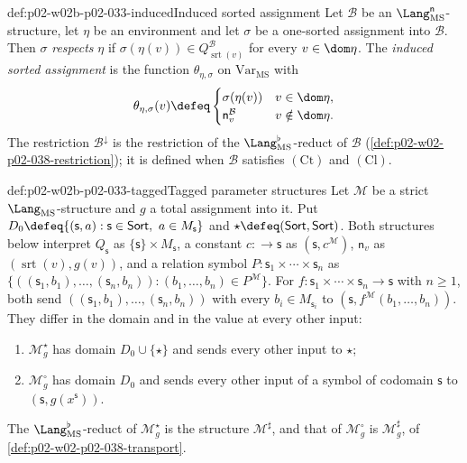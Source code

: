 \begin{hbdefinition}{def:p02-w02b-p02-033-induced}{Induced sorted assignment}
Let \(\mathcal B\) be an \(\Lang_{\mathrm{MS}}^{\mathsf n}\)-structure, let
\(\eta\) be an environment and let \(\sigma\) be a one-sorted assignment into
\(\mathcal B\).  Then \(\sigma\) \emph{respects} \(\eta\) if
\(\sigma(\eta(v))\in Q_{\operatorname{srt}(v)}^{\mathcal B}\) for every
\(v\in\dom\eta\).  The \emph{induced sorted assignment} is the function
\(\theta_{\eta,\sigma}\) on \(\mathrm{Var}_{\mathrm{MS}}\) with
\[
 \theta_{\eta,\sigma}(v)\defeq
 \begin{cases}
  \sigma(\eta(v)) & v\in\dom\eta,\\
  \mathsf n_v^{\mathcal B} & v\notin\dom\eta.
 \end{cases}
\]
The restriction \(\mathcal B^{\downarrow}\) is the restriction of the
\(\Lang_{\mathrm{MS}}^{\flat}\)-reduct of \(\mathcal B\)
(\cref{def:p02-w02-p02-038-restriction}); it is defined when \(\mathcal B\)
satisfies \((\mathrm{Ct})\) and \((\mathrm{Cl})\).
\end{hbdefinition}

\begin{hbdefinition}{def:p02-w02b-p02-033-tagged}{Tagged parameter structures}
Let \(\mathcal M\) be a strict \(\Lang_{\mathrm{MS}}\)-structure and \(g\) a
total assignment into it.  Put
\(D_0\defeq\{(\mathsf s,a):\mathsf s\in\mathsf{Sort},\ a\in M_{\mathsf s}\}\)
and \(\star\defeq(\mathsf{Sort},\mathsf{Sort})\).  Both structures below
interpret \(Q_{\mathsf s}\) as \(\{\mathsf s\}\times M_{\mathsf s}\), a
constant \(c:\longrightarrow\mathsf s\) as \((\mathsf s,c^{\mathcal M})\),
\(\mathsf n_v\) as \((\operatorname{srt}(v),g(v))\), and a relation symbol
\(P:\mathsf s_1\times\cdots\times\mathsf s_n\) as
\(\{((\mathsf s_1,b_1),\ldots,(\mathsf s_n,b_n)):(b_1,\ldots,b_n)\in
P^{\mathcal M}\}\).  For
\(f:\mathsf s_1\times\cdots\times\mathsf s_n\longrightarrow\mathsf s\) with
\(n\geq1\), both send \(((\mathsf s_1,b_1),\ldots,(\mathsf s_n,b_n))\) with
every \(b_i\in M_{\mathsf s_i}\) to
\((\mathsf s,f^{\mathcal M}(b_1,\ldots,b_n))\).  They differ in the domain and
in the value at every other input:
\begin{enumerate}
\item \(\mathcal M^{\star}_{g}\) has domain \(D_0\cup\{\star\}\) and sends
      every other input to \(\star\);
\item \(\mathcal M^{\circ}_{g}\) has domain \(D_0\) and sends every other
      input of a symbol of codomain \(\mathsf s\) to
      \((\mathsf s,g(x^{\mathsf s}))\).
\end{enumerate}
The \(\Lang_{\mathrm{MS}}^{\flat}\)-reduct of \(\mathcal M^{\star}_{g}\) is
the structure \(\mathcal M^{\sharp}\), and that of \(\mathcal M^{\circ}_{g}\)
is \(\mathcal M^{\sharp}_{g}\), of
\cref{def:p02-w02-p02-038-transport}.
\end{hbdefinition}

